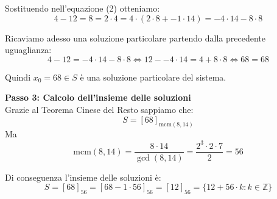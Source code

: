 \documentclass[12pt]{article}
\begin{document}
Sostituendo nell'equazione (2) otteniamo:
$$4 - 12 = 8 = 2 \cdot 4 = 4 \cdot (2 \cdot 8 + -1 \cdot 14) = -4 \cdot 14 - 8 \cdot 8$$

Ricaviamo adesso una soluzione particolare partendo dalla precedente uguaglianza:
$$4 - 12 = -4 \cdot 14 - 8 \cdot 8 \iff 12 - -4 \cdot 14 = 4 + 8 \cdot 8 \iff 68 = 68$$

Quindi $x_0 = 68 \in S$ è una soluzione particolare del sistema.


\textbf{Passo 3: Calcolo dell'insieme delle soluzioni} \\ 
Grazie al Teorema Cinese del Resto sappiamo che:
$$S = [68]_{\mathrm{mcm}(8, 14)}$$
Ma
$$\mathrm{mcm}({8}, {14}) = \frac{{8} \cdot {14}}{\gcd({8},{14})} = \frac{{2^{3}} \cdot {2 \cdot 7}}{2} = {56}$$

Di conseguenza l'insieme delle soluzioni è:
        $$S = [68]_{56} = [68 - 1 \cdot 56]_{56} = [12]_{56} = \{12 + 56 \cdot k : k \in \mathbb{Z}\}$$
        
\end{document}
